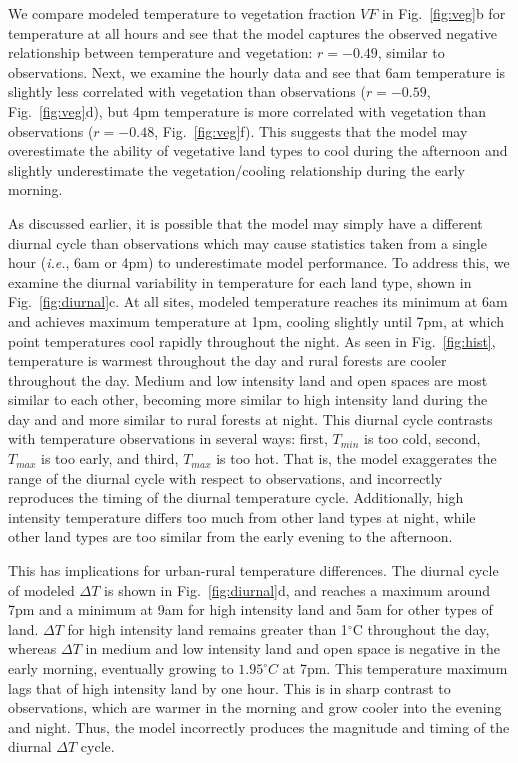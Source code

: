 We compare modeled temperature to vegetation fraction $VF$ in Fig.~\ref{fig:veg}b for temperature at all hours and see that
the model captures the observed negative relationship between temperature and vegetation: $r= -0.49$, similar to observations. Next, we examine the hourly data and see that 6am temperature is slightly less correlated with vegetation than observations ($r= -0.59$, Fig.~\ref{fig:veg}d), but 4pm temperature is more correlated with vegetation than observations ($r= -0.48$, Fig.~\ref{fig:veg}f). This suggests that the model may overestimate the ability of vegetative land types to cool during the afternoon and slightly underestimate the vegetation/cooling relationship during the early morning. 

As discussed earlier, it is possible that the model may simply have a different diurnal cycle than observations which may cause statistics taken from a single hour (\textit{i.e.}, 6am or 4pm) to underestimate model performance. To address this, we examine the diurnal variability in temperature for each land type, shown in Fig.~\ref{fig:diurnal}c. At all sites, modeled temperature reaches its minimum at 6am and achieves maximum temperature at 1pm, cooling slightly until  7pm, at which point temperatures cool rapidly throughout the night. As seen in Fig.~\ref{fig:hist}, 
temperature is warmest throughout the day and rural forests are cooler throughout the day. Medium and low intensity land and open spaces are most similar to each other, becoming more similar to high intensity land during the day and and more similar to rural forests at night. 
This diurnal cycle contrasts with temperature observations in several ways: first, $T_{min}$ is too cold, second, $T_{max}$ is too early, and third, $T_{max}$ is too hot. That is, the model exaggerates the range of the diurnal cycle with respect to observations, and incorrectly reproduces the timing of the diurnal temperature cycle. Additionally, high intensity temperature differs too much from other land types at night, while other land types are too similar from the early evening to the afternoon. 
 
 This has implications for urban-rural temperature differences. The diurnal cycle of modeled $\Delta T$ is shown in Fig.~\ref{fig:diurnal}d, and reaches a maximum around 7pm and a minimum at 9am for high intensity land and 5am for other types of land. $\Delta T$ for high intensity land remains greater than 1$^\circ$C throughout the day, whereas $\Delta T$ in medium and low intensity land and open space is negative in the early morning, eventually growing to $1.95^\circ C$ at 7pm. This temperature maximum lags that of high intensity land by one hour. This is in sharp contrast to observations, which are warmer in the morning and grow cooler into the evening and night. Thus, the model incorrectly produces the magnitude and timing of the diurnal $\Delta T$ cycle. %
 

